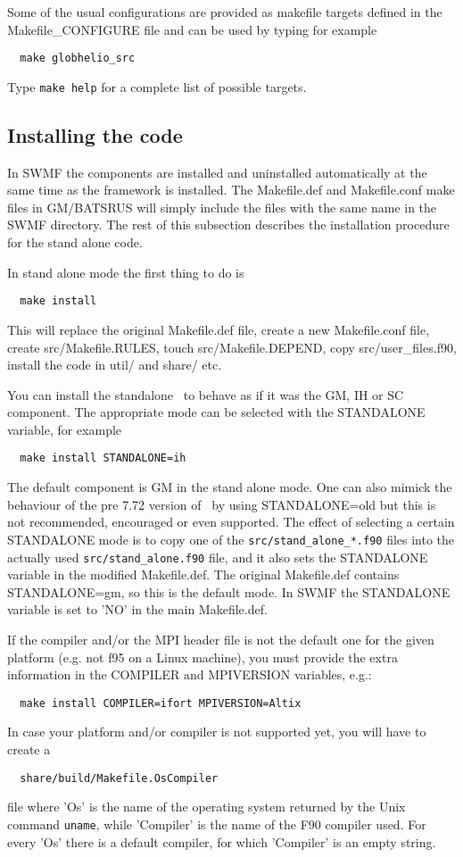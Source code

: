 Some of the usual configurations are provided as makefile targets 
defined in the Makefile\_CONFIGURE file and can be used by typing
for example
\begin{verbatim}
  make globhelio_src
\end{verbatim}
Type {\tt make help} for a complete list of possible targets.

\subsection{Installing the code}

In SWMF the components are installed and uninstalled automatically 
at the same time as the framework is installed.
The Makefile.def and Makefile.conf make files in GM/BATSRUS will 
simply include the files with the same name in the SWMF directory.
The rest of this subsection describes the installation procedure
for the stand alone code.
 
In stand alone mode the first thing to do is
\begin{verbatim}
  make install
\end{verbatim}
This will replace the original Makefile.def file, 
create a new Makefile.conf file, 
create src/Makefile.RULES, touch src/Makefile.DEPEND, 
copy src/user\_files.f90, install the code in util/ and share/ etc.

You can install the standalone \BATSRUS\ to behave as if it
was the GM, IH or SC component. The appropriate mode can be
selected with the STANDALONE variable, for example
\begin{verbatim}
  make install STANDALONE=ih
\end{verbatim}
The default component is GM in the stand alone mode.
One can also mimick the behaviour of the pre 7.72 version of \BATSRUS\
by using STANDALONE=old but this is not recommended, encouraged
or even supported. The effect of selecting a certain STANDALONE
mode is to copy one of the {\tt src/stand\_alone\_*.f90} files
into the actually used {\tt src/stand\_alone.f90} file,
and it also sets the STANDALONE variable in the modified Makefile.def.
The original Makefile.def contains STANDALONE=gm, so this is the
default mode. In SWMF the STANDALONE variable is set to 'NO'
in the main Makefile.def.

If the compiler and/or the MPI header file is not the default one
for the given platform (e.g. not f95 on a Linux machine), 
you must provide the extra information in the COMPILER and MPIVERSION 
variables, e.g.:
\begin{verbatim}
  make install COMPILER=ifort MPIVERSION=Altix
\end{verbatim}
In case your platform and/or compiler is not supported yet, 
you will have to create a
\begin{verbatim}
  share/build/Makefile.OsCompiler
\end{verbatim}
file where 'Os' is the name of the operating system returned
by the Unix command {\tt uname}, while 'Compiler' is the name
of the F90 compiler used. For every 'Os' there is a default
compiler, for which 'Compiler' is an empty string.

